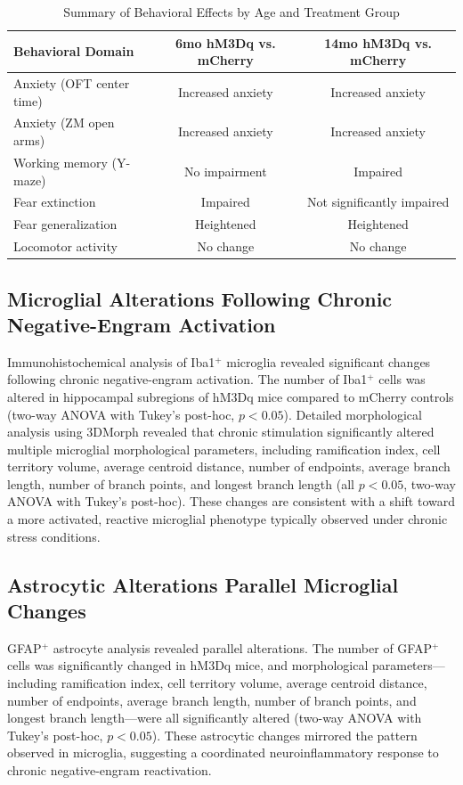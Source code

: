 \documentclass[11pt]{article}
\begin{document}
\begin{table}[ht]
\centering
\caption{Summary of Behavioral Effects by Age and Treatment Group}
\label{tab:summary}
\begin{tabular}{lcc}
\toprule
\textbf{Behavioral Domain} & \textbf{6mo hM3Dq vs. mCherry} & \textbf{14mo hM3Dq vs. mCherry} \\
\midrule
Anxiety (OFT center time) & Increased anxiety & Increased anxiety \\
Anxiety (ZM open arms) & Increased anxiety & Increased anxiety \\
Working memory (Y-maze) & No impairment & Impaired \\
Fear extinction & Impaired & Not significantly impaired \\
Fear generalization & Heightened & Heightened \\
Locomotor activity & No change & No change \\
\bottomrule
\end{tabular}
\end{table}

\subsection{Microglial Alterations Following Chronic Negative-Engram Activation}

Immunohistochemical analysis of Iba1$^+$ microglia revealed significant changes following chronic negative-engram activation. The number of Iba1$^+$ cells was altered in hippocampal subregions of hM3Dq mice compared to mCherry controls (two-way ANOVA with Tukey's post-hoc, $p < 0.05$). Detailed morphological analysis using 3DMorph revealed that chronic stimulation significantly altered multiple microglial morphological parameters, including ramification index, cell territory volume, average centroid distance, number of endpoints, average branch length, number of branch points, and longest branch length (all $p < 0.05$, two-way ANOVA with Tukey's post-hoc). These changes are consistent with a shift toward a more activated, reactive microglial phenotype typically observed under chronic stress conditions.

\subsection{Astrocytic Alterations Parallel Microglial Changes}

GFAP$^+$ astrocyte analysis revealed parallel alterations. The number of GFAP$^+$ cells was significantly changed in hM3Dq mice, and morphological parameters---including ramification index, cell territory volume, average centroid distance, number of endpoints, average branch length, number of branch points, and longest branch length---were all significantly altered (two-way ANOVA with Tukey's post-hoc, $p < 0.05$). These astrocytic changes mirrored the pattern observed in microglia, suggesting a coordinated neuroinflammatory response to chronic negative-engram reactivation.
\end{document}
